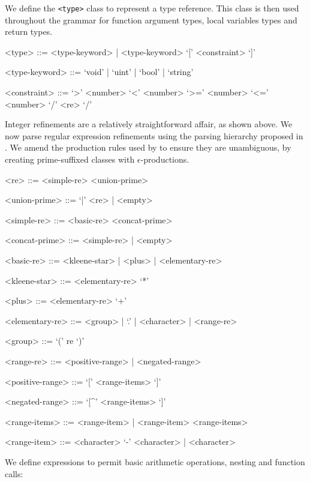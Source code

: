 \documentclass[a4paper,openany,12pt]{book}
\begin{document}
We define the \texttt{<type>} class to represent a type reference.
This class is then used throughout the grammar for function argument types, local variables types and return
types.

\begin{grammar}
    <type> ::= <type-keyword> | <type-keyword> `[' <constraint> `]'

    <type-keyword> ::= `void' | `uint' | `bool' | `string'

    <constraint> ::= `>' <number> \alt `<' <number> \alt `>=' <number> \alt `<=' <number> \alt `/' <re> `/'
\end{grammar}

Integer refinements are a relatively straightforward affair, as shown above.
We now parse regular expression refinements using the parsing hierarchy proposed in \citet{cameron1999}.
We amend the production rules used by \citeauthor{cameron1999} to ensure they are unambiguous, by creating
prime-suffixed classes with $\epsilon$-productions.

\begin{grammar}

    <re> ::= <simple-re> <union-prime>

    <union-prime> ::= `|' <re> | <empty>

    <simple-re> ::= <basic-re> <concat-prime>

    <concat-prime> ::= <simple-re> | <empty>

    <basic-re> ::= <kleene-star> | <plus> | <elementary-re>

    <kleene-star> ::= <elementary-re> `*'

    <plus> ::= <elementary-re> `+'

    <elementary-re> ::= <group> | `.' | <character> | <range-re>

    <group> ::= `(' re `)'

    <range-re> ::= <positive-range> | <negated-range>

    <positive-range> ::= `[' <range-items> `]'

    <negated-range> ::= `[^' <range-items> `]'

    <range-items> ::= <range-item> | <range-item> <range-items>

    <range-item> ::= <character> `-' <character> | <character>

\end{grammar}

We define expressions to permit basic arithmetic operations, nesting and function calls:
\end{document}
